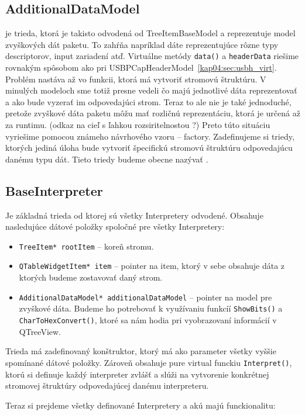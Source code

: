 \subsection{AdditionalDataModel}
je trieda, ktorá je takisto odvodená od TreeItemBaseModel a reprezentuje model zvyškových dát paketu. To zahŕňa napríklad dáte reprezentujúce rôzne typy descriptorov, input zariadení atď. Virtuálne metódy \texttt{data()} a \texttt{headerData} riešime rovnakým spôsobom ako pri USBPCapHeaderModel~\ref{kap04:sec:usbh_virt}. Problém nastáva až vo funkcii, ktorá má vytvoriť stromovú štruktúru. V minulých modeloch sme totiž presne vedeli čo majú jednotlivé dáta reprezentovať a ako bude vyzerať im odpovedajúci strom. Teraz to ale nie je také jednoduché, pretože zvyškové dáta paketu môžu mať rozličnú reprezentáciu, ktorá je určená až za runtimu. (odkaz na cieľ s ľahkou rozsiritelnostou ?) Preto túto situáciu vyriešime pomocou známeho návrhového vzoru -- factory. Zadefinujeme si triedy, ktorých jediná úloha bude vytvoriť špecifickú stromovú štruktúru odpovedajúcu danému typu dát. Tieto triedy budeme obecne nazývať .

\subsection{BaseInterpreter}
Je základná trieda od ktorej sú všetky Interpretery odvodené. Obsahuje nasledujúce dátové položky spoločné pre všetky Interpretery:
\begin{itemize}
\item \texttt{TreeItem* rootItem} -- koreň stromu.
\item \texttt{QTableWidgetItem* item} -- pointer na item, ktorý v sebe obsahuje dáta z ktorých budeme zostavovať daný strom.
\item \texttt{AdditionalDataModel* additionalDataModel} -- pointer na model \newline pre zvyškové dáta. Budeme ho potrebovať k využívaniu funkcíí \texttt{ShowBits()} a \texttt{CharToHexConvert()}, ktoré sa nám hodia pri vyobrazovaní informácií v QTreeView.
\end{itemize}

Trieda má zadefinovaný konštruktor, ktorý má ako parameter všetky vyššie spomínané dátové položky. Zároveň obsahuje pure virtual funckiu \texttt{Interpret()}, ktorú si definuje každý interpreter zvlášť a slúži na vytvorenie konkrétnej stromovej štruktúry odpovedajúcej danému interpreteru.

Teraz si prejdeme všetky definované Interpretery a akú majú funckionalitu:

